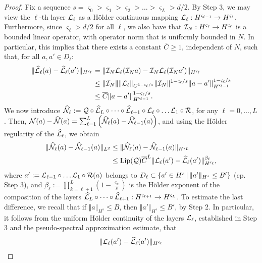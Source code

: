 \documentclass[reqno,a4paper]{amsart}
\begin{document}
\begin{proof}
Fix a sequence $s = \varsigma_0 > \varsigma_1 > \varsigma_2> \dots > \varsigma_L > d/2$. By Step 3, we may view the $\ell$-th layer $\mathcal{L}_\ell$ as a H\"older continuous mapping $\mathcal{L}_\ell: H^{\varsigma_{\ell-1}} \to H^{\varsigma_\ell}$. Furthermore, since $\varsigma_{\ell} > d/2$ for all $\ell$, we also have that $\mathcal{I}_N: H^{\varsigma_{\ell}} \to H^{\varsigma_{\ell}}$ is a bounded linear operator, with operator norm that is uniformly bounded in $N$. In particular, this implies that there exists a constant $\bar{C} \ge 1$, independent of $N$, such that, for all $a,a'\in D_\ell$:
\begin{align*}
\Vert \widehat{\mathcal{L}}_{\ell}(a) - \widehat{\mathcal{L}}_{\ell}(a') \Vert_{H^{\varsigma_{\ell}}}
&=
\Vert \mathcal{I}_N \mathcal{L}_{\ell}(\mathcal{I}_N a) - \mathcal{I}_N \mathcal{L}_{\ell}(\mathcal{I}_N a') \Vert_{H^{\varsigma_{\ell}}}
\\
&\le
\Vert \mathcal{I}_N \Vert \Vert \mathcal{L}_{\ell} \Vert_{C^{1-\varsigma_\ell/s}}\Vert \mathcal{I}_N \Vert^{1-\varsigma_\ell/s} \Vert a - a' \Vert_{H^{\varsigma_{\ell-1}}}^{1-\varsigma_\ell/s}
\\
&\le
\overline{C} \Vert a - a' \Vert_{H^{\varsigma_{\ell-1}}}^{1-\varsigma_\ell/s}.
\end{align*}
We now introduce $\widehat{\mathcal{N}}_{\ell} := \mathcal{Q} \circ \widehat{\mathcal{L}}_L \circ \dots \circ \widehat{\mathcal{L}}_{\ell+1} \circ \mathcal{L}_{\ell} \circ \dots \mathcal{L}_1 \circ \mathcal{R}$, for any $\ell=0,\dots, L$. Then, $\mathcal{N}(a) - \widehat{\mathcal{N}}(a) = \sum_{\ell=1}^L \left(\widehat{\mathcal{N}}_\ell(a) - \widehat{\mathcal{N}}_{\ell-1}(a) \right)$, and using the H\"older regularity of the $\widehat{\mathcal{L}}_{\ell}$, we obtain
\begin{align*}
\Vert \widehat{\mathcal{N}}_{\ell}(a) - \widehat{\mathcal{N}}_{\ell-1}(a) \Vert_{L^2}
&\le \Vert \widehat{\mathcal{N}}_{\ell}(a) - \widehat{\mathcal{N}}_{\ell-1}(a) \Vert_{H^{\varsigma_{L}}}
\\
&\le
\mathrm{Lip}(\mathcal{Q})
\overline{C}^L \Vert \mathcal{L}_{\ell}(a') - \widehat{\mathcal{L}}_{\ell}(a') \Vert_{H^{\varsigma_{\ell}}}^{\beta_\ell},
\end{align*}
where $a' := \mathcal{L}_{\ell-1} \circ \dots \mathcal{L}_{1} \circ \mathcal{R}(a)$ belongs to $D_\ell \subset {\left\{ a'\in H^s \,\middle|\, \Vert a' \Vert_{H^s} \le B' \right\}}$ (cp. Step 3), and $\beta_\ell := \prod_{k=\ell+1}^L \left(1 - \frac{\varsigma_{k}}{s} \right)$ is the H\"older exponent of the composition of the layers $\widehat{\mathcal{L}}_{L} \circ \dots \circ \widehat{\mathcal{L}}_{\ell+1}: H^{\varsigma_{\ell+1}} \to H^{\varsigma_{L}}$. To estimate the last difference, we recall that if $\Vert a \Vert_{H^s}\le B$, then $\Vert a' \Vert_{H^{s}} \le B'$, by Step 2. In particular, it follows from the uniform H\"older continuity of the layers $\mathcal{L}_{\ell}$, established in Step 3 and the pseudo-spectral approximation estimate, that 
\begin{align*}
\Vert \cL_{\ell}(a') - \hL_{\ell}(a') \Vert_{H^{\varsigma_{\ell}}}

\end{align*}
\end{proof}
\end{document}
